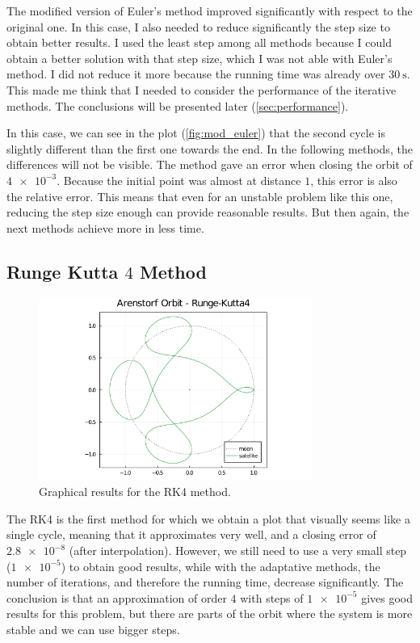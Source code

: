 \documentclass[12pt, onside]{article}
\begin{document}
    The modified version of Euler's method improved significantly with respect
to the original one.
In this case, I also needed to reduce significantly the step size to obtain better results.
I used the least step among all methods because I could obtain
a better solution with that step size,
which I was not able with Euler's method.
I did not reduce it more because the running time was already over $\SI{30}{\s}$.
This made me think that I needed to consider the performance of the iterative methods.
The conclusions will be presented later (\cref{sec:performance}).

    In this case, we can see in the plot (\cref{fig:mod_euler}) that the second cycle
is slightly different than the first one towards the end.
In the following methods, the differences will not be visible.
The method gave an error when closing the orbit of $\num{4e-3}$.
Because the initial point was almost at distance $1$, this error is also the relative error.
This means that even for an unstable problem like this one,
reducing the step size enough can provide reasonable results.
But then again,
the next methods achieve more in less time.



\subsection{Runge Kutta $4$ Method}

\begin{figure}[H]
    \centering
    \includegraphics[width=0.8\textwidth]{media/arenstorf/rk4.png}
    \caption{Graphical results for the RK4 method.}
\end{figure}

    The RK4 is the first method for which we obtain a plot that
visually seems like a single cycle,
meaning that it approximates very well,
and a closing error of $\num{2.8e-8}$ (after interpolation).
However, we still need to use a very small step ($\num{1e-5}$) to obtain good results,
while with the adaptative methods,
the number of iterations, and therefore the running time,
decrease significantly.
The conclusion is that an approximation of order $4$ with steps of $\num{1e-5}$
gives good results for this problem,
but there are parts of the orbit where the system is more stable and we can use bigger steps.
\end{document}
